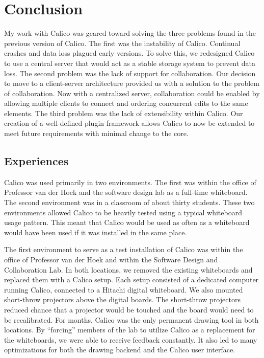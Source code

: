 \chapter{Conclusion}
My work with Calico was geared toward solving the three problems found in the previous version of Calico. The first was the instability of Calico. Continual crashes and data loss plagued early versions. To solve this, we redesigned Calico to use a central server that would act as a stable storage system to prevent data loss. The second problem was the lack of support for collaboration. Our decision to move to a client-server architecture provided us with a solution to the problem of collaboration. Now with a centralized server, collaboration could be enabled by allowing multiple clients to connect and ordering concurrent edits to the same elements. The third problem was the lack of extensibility within Calico. Our creation of a well-defined plugin framework allows Calico to now be extended to meet future requirements with minimal change to the core.

\section*{Experiences}



Calico was used primarily in two environments. The first was within the office of Professor van der Hoek and the software design lab as a full-time whiteboard. The second environment was in a classroom of about thirty students. These two environments allowed Calico to be heavily tested using a typical whiteboard usage pattern. This meant that Calico would be used as often as a whiteboard would have been used if it was installed in the same place.

The first environment to serve as a test installation of Calico was within the office of Professor van der Hoek and within the Software Design and Collaboration Lab. In both locations, we removed the existing whiteboards and replaced them with a Calico setup. Each setup consisted of a dedicated computer running Calico, connected to a Hitachi digital whiteboard. We also mounted short-throw projectors above the digital boards. The short-throw projectors reduced chance that a projector would be touched and the board would need to be recalibrated. For months, Calico was the only permanent drawing tool in both locations. By ``forcing'' members of the lab to utilize Calico as a replacement for the whiteboards, we were able to receive feedback constantly. It also led to many optimizations for both the drawing backend and the Calico user interface.


